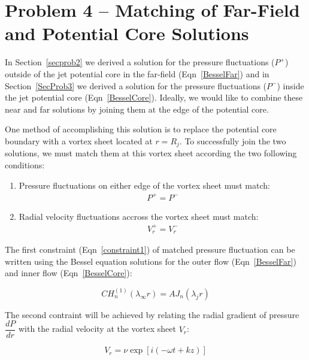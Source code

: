 \documentclass[]{aiaa-tc}%
\begin{document}
\section{Problem 4 -- Matching of Far-Field and Potential Core Solutions}

In Section~\ref{secprob2} we derived a solution for the pressure fluctuations ($P^+$) outside of the jet potential core in the far-field (Eqn~\ref{BesselFar}) and in Section~\ref{SecProb3} we derived a solution for the pressure fluctuations ($P^-$) inside the jet potential core (Eqn~\ref{BesselCore}).  Ideally, we would like to combine these near and far solutions by joining them at the edge of the potential core.

One method of accomplishing this solution is to replace the potential core boundary with a vortex sheet located at $r = R_j$.  To successfully join the two solutions, we must match them at this vortex sheet according the two following conditions:

\begin{enumerate}
  \item Pressure fluctuations on either edge of the vortex sheet must match:
        \begin{align} \label{constraint1}
          P^+ = P^-
        \end{align}
  \item Radial velocity fluctuations accross the vortex sheet must match:
        \begin{align} \label{constraint2}
          V_r^+ = V_r^-
        \end{align}
\end{enumerate}

The first constraint (Eqn~\ref{constraint1}) of matched pressure fluctuation can be written using the Bessel equation solutions for the outer flow (Eqn~\ref{BesselFar}) and inner flow (Eqn~\ref{BesselCore}):

\begin{equation} \label{constantsEqn1}
\boxed{C H_n^{(1)}(\lambda_{\infty} r) = A J_n(\lambda_j r)}
\end{equation}

The second contraint will be achieved by relating the radial gradient of pressure $\dfrac{dP}{dr}$ with the radial velocity at the vortex sheet $V_r$:

\begin{equation}
V_r = \nu \exp[i(-\omega t + kz)]
\end{equation}
\end{document}
